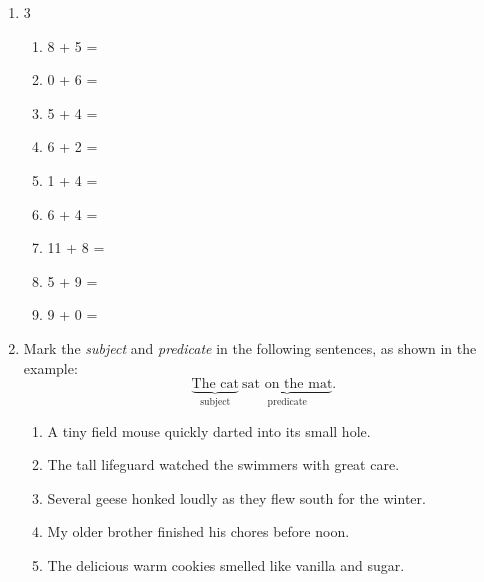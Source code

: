 \documentclass{tufte-book}
\begin{document}
\begin{enumerate}
  \item
  \begin{multicols}{3}
    \begin{enumerate}\bigskip
      \item 8 + 5 = \dotfill\bigskip
      \item 0 + 6 = \dotfill\bigskip
      \item 5 + 4 = \dotfill
      \item 6 + 2 = \dotfill\bigskip
      \item 1 + 4 = \dotfill\bigskip
      \item 6 + 4 = \dotfill
      \item 11 + 8 = \dotfill\bigskip
      \item 5 + 9 = \dotfill\bigskip
      \item 9 + 0 = \dotfill
    \end{enumerate}
\end{multicols}

  \item Mark the \textit{subject} and \textit{predicate} in the following sentences, as shown in the example:
  $$\underbrace{\text{The cat}}_{\text{subject}} \  \underbrace{\text{sat on the mat}}_{\text{predicate}}.$$
    \begin{enumerate}
    \item A tiny field mouse quickly darted into its small hole.\bigskip\bigskip
    \item The tall lifeguard watched the swimmers with great care.\bigskip\bigskip
    \item Several geese honked loudly as they flew south for the winter.\bigskip\bigskip
    \item My older brother finished his chores before noon.\bigskip\bigskip
    \item The delicious warm cookies smelled like vanilla and sugar.\bigskip\bigskip
  \end{enumerate}


\end{enumerate}
\end{document}
